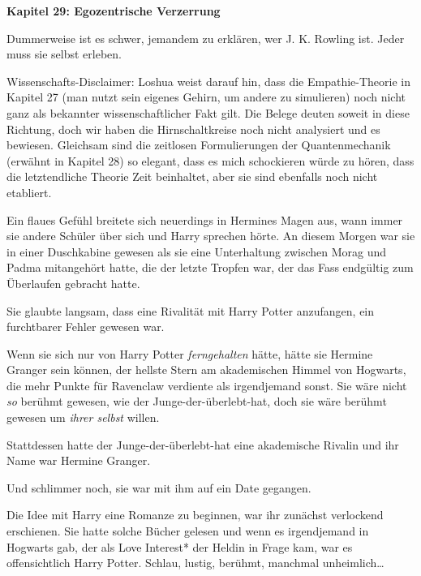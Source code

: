 

\hypertarget{egozentrische-verzerrung}{%

\textbf{Kapitel 29: Egozentrische Verzerrung}

Dummerweise ist es schwer, jemandem zu erklären, wer J. K. Rowling ist. Jeder muss sie selbst erleben.

Wissenschafts-Disclaimer: Loshua weist darauf hin, dass die Empathie-Theorie in Kapitel 27 (man nutzt sein eigenes Gehirn, um andere zu simulieren) noch nicht ganz als bekannter wissenschaftlicher Fakt gilt. Die Belege deuten soweit in diese Richtung, doch wir haben die Hirnschaltkreise noch nicht analysiert und es bewiesen. Gleichsam sind die zeitlosen Formulierungen der Quantenmechanik (erwähnt in Kapitel 28) so elegant, dass es mich schockieren würde zu hören, dass die letztendliche Theorie Zeit beinhaltet, aber sie sind ebenfalls noch nicht etabliert.

\later

Ein flaues Gefühl breitete sich neuerdings in Hermines Magen aus, wann immer sie andere Schüler über sich und Harry sprechen hörte. An diesem Morgen war sie in einer Duschkabine gewesen als sie eine Unterhaltung zwischen Morag und Padma mitangehört hatte, die der letzte Tropfen war, der das Fass endgültig zum Überlaufen gebracht hatte.

Sie glaubte langsam, dass eine Rivalität mit Harry Potter anzufangen, ein furchtbarer Fehler gewesen war.

Wenn sie sich nur von Harry Potter \emph{ferngehalten} hätte, hätte sie Hermine Granger sein können, der hellste Stern am akademischen Himmel von Hogwarts, die mehr Punkte für Ravenclaw verdiente als irgendjemand sonst. Sie wäre nicht \emph{so} berühmt gewesen, wie der Junge-der-überlebt-hat, doch sie wäre berühmt gewesen um \emph{ihrer selbst} willen.

Stattdessen hatte der Junge-der-überlebt-hat eine akademische Rivalin und ihr Name war Hermine Granger.

Und schlimmer noch, sie war mit ihm auf ein Date gegangen.

Die Idee mit Harry eine Romanze zu beginnen, war ihr zunächst verlockend erschienen. Sie hatte solche Bücher gelesen und wenn es irgendjemand in Hogwarts gab, der als Love Interest* der Heldin in Frage kam, war es offensichtlich Harry Potter. Schlau, lustig, berühmt, manchmal unheimlich…

}
